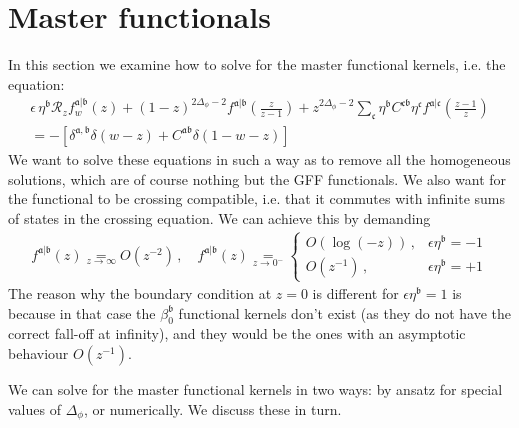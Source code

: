 \documentclass[12pt]{article}
\numberwithin{equation}{section}
\newcommand{\bea}{\begin{eqnarray}}
\newcommand{\eea}{\end{eqnarray}}
\newcommand{\Df}{{\Delta_\phi}}
\newcommand{\mf}[1]{\mathfrak #1}
\begin{document}
	\section{Master functionals}
	\label{app:master}
	In this section we examine how to solve for the master functional kernels, i.e. the equation:
	\begin{multline}
	\label{eq:mastereq2}
	\epsilon\, \eta^{\mf b} \mathcal R_z f_w^{\mf a|\mf b}(z)+(1-z)^{2\Df-2} f^{\mf a|\mf b}(\mbox{$\frac{z}{z-1}$})+z^{2\Df -2}\sum_{\mf c} \eta^{\mf b} C^{\mf c \mf b} \eta^{\mf c} f^{\mf a|\mf c}(\mbox{$\frac{z-1}{z}$})\\=-\left[\delta^{\mf a,\mf b}\delta(w-z)+C^{\mf a \mf b} \delta(1-w-z)\right]
	\end{multline}
	We want to solve these equations in such a way as to remove all the homogeneous solutions, which are of course nothing but the GFF functionals. We also want for the functional to be crossing compatible, i.e. that it commutes with infinite sums of states in the crossing equation. We can achieve this by demanding
	\bea
	f^{\mf a|\mf b}(z)\underset{z\to \infty}{=} O(z^{-2})\,,\quad f^{\mf a|\mf b}(z)\underset{z\to 0^-}=\left\{
	\begin{array}{ll}
		O(\log(-z))\,, & \epsilon \eta^{\mf b}=-1 \\
		O(z^{-1})\,, & \epsilon \eta^{\mf b}=+1
	\end{array}
	\right.
	\eea
	The reason why the boundary condition at $z=0$ is different for $\epsilon\eta^{\mf b}=1$ is because in that case the $\beta_0^{\mf b}$ functional kernels don't exist (as they do not have the correct fall-off at infinity), and they would be the ones with an asymptotic behaviour $O(z^{-1})$.
	
	We can solve for the master functional kernels in two ways: by ansatz for special values of $\Df$, or numerically. We discuss these in turn.
	
\end{document}
